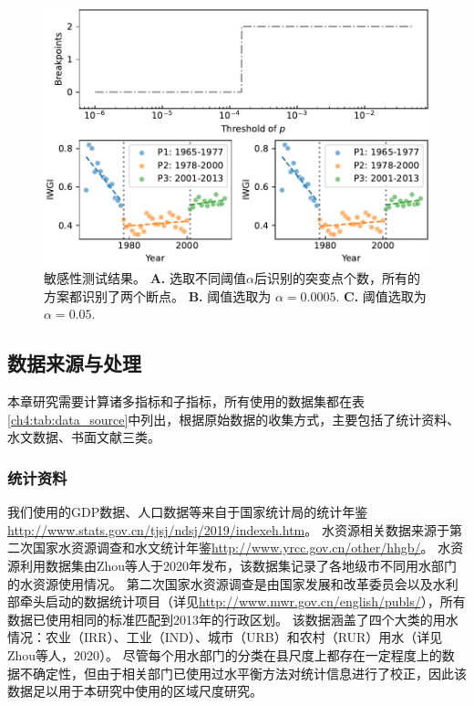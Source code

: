 \begin{figure}[htb] %
    \includegraphics[width=\textwidth]{img/ch4/sensitivity.pdf}
    \caption[敏感性测试结果]{敏感性测试结果。
    \textbf{A.} 选取不同阈值$\alpha$后识别的突变点个数，所有的方案都识别了两个断点。
    \textbf{B.} 阈值选取为 $\alpha=0.0005$.
    \textbf{C.} 阈值选取为 $\alpha=0.05$.}\label{ch4:fig:sensitivity}
\end{figure}

\subsection{数据来源与处理}
本章研究需要计算诸多指标和子指标，所有使用的数据集都在表\ref{ch4:tab:data_source}中列出，根据原始数据的收集方式，主要包括了统计资料、水文数据、书面文献三类。



\subsubsection*{统计资料}
我们使用的GDP数据、人口数据等来自于国家统计局的统计年鉴\url{http://www.stats.gov.cn/tjsj/ndsj/2019/indexeh.htm}。
水资源相关数据来源于第二次国家水资源调查\cite{zhou2020}和水文统计年鉴\url{http://www.yrcc.gov.cn/other/hhgb/}。
水资源利用数据集由Zhou等人于2020年\cite{zhou2020}发布，该数据集记录了各地级市不同用水部门的水资源使用情况。
第二次国家水资源调查是由国家发展和改革委员会以及水利部牵头启动的数据统计项目（详见\url{http://www.mwr.gov.cn/english/publs/}），所有数据已使用相同的标准匹配到2013年的行政区划。
该数据涵盖了四个大类的用水情况：农业（IRR）、工业（IND）、城市（URB）和农村（RUR）用水（详见Zhou等人，2020\cite{zhou2020}）。
尽管每个用水部门的分类在县尺度上都存在一定程度上的数据不确定性，但由于相关部门已使用过水平衡方法对统计信息进行了校正，因此该数据足以用于本研究中使用的区域尺度研究。

